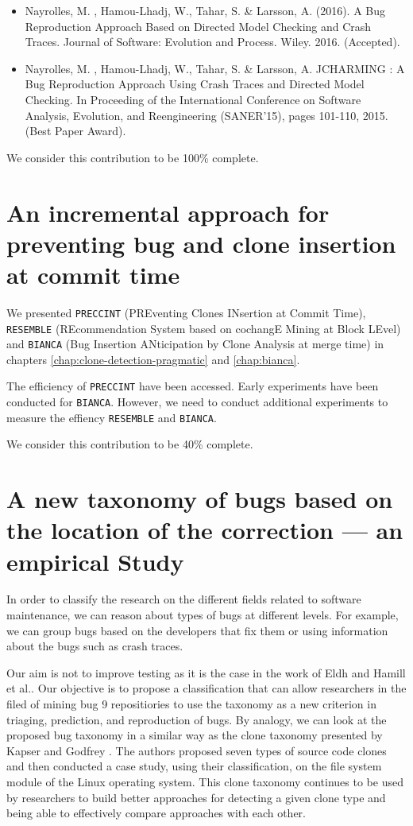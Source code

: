 \begin{itemize}
	\item Nayrolles, M. , Hamou-Lhadj, W., Tahar, S. & Larsson, A. (2016). A Bug Reproduction Approach Based on Directed Model Checking and Crash Traces. Journal of Software: Evolution and Process. Wiley. 2016. (Accepted).
	\item Nayrolles, M. , Hamou-Lhadj, W., Tahar, S. & Larsson, A. JCHARMING : A Bug Reproduction Approach Using Crash Traces and Directed Model Checking. In Proceeding of the International Conference on Software Analysis, Evolution, and Reengineering (SANER'15), pages 101-110, 2015. (Best Paper Award).
\end{itemize}

We consider this contribution to be 100\% complete.

\section{An incremental approach for preventing bug and clone insertion at commit time}

We presented {\tt PRECCINT} (PREventing Clones INsertion at Commit Time), {\tt RESEMBLE} (REcommendation System based on cochangE Mining at Block LEvel) and {\tt BIANCA} (Bug Insertion ANticipation by Clone Analysis at merge time) in chapters \ref{chap:clone-detection-pragmatic} and \ref{chap:bianca}.

The efficiency of {\tt PRECCINT} have been accessed.
Early experiments have been conducted for {\tt BIANCA}.
However, we need to conduct additional experiments to measure the effiency {\tt RESEMBLE} and {\tt BIANCA}.

We consider this contribution to be 40\% complete.

\section{A new taxonomy of bugs based on the location of the correction --- an empirical Study}


In order to classify the research on the different fields related to software maintenance, we can reason about types of bugs at different levels. For
example, we can group bugs based on the developers that fix
them or using information about the bugs such as crash traces.


Our aim is not to improve testing as it is the case in the work of Eldh \cite{Eldh2001} and Hamill et al.\cite{Hamill2014}.
Our objective is to propose a classification that can allow researchers in the filed of mining bug 9 repositiories to use the taxonomy as a new criterion in triaging, prediction, and reproduction of bugs.
By analogy, we can look at the proposed bug taxonomy in a similar way as the clone taxonomy presented by Kapser and Godfrey \cite{CoryKapser}.
The authors proposed seven types of source code clones and then conducted a case study, using their classification, on the file system module of the Linux operating system.
This clone taxonomy continues to be used by researchers to build better approaches for detecting a given clone type and being able to effectively compare approaches with each other.

